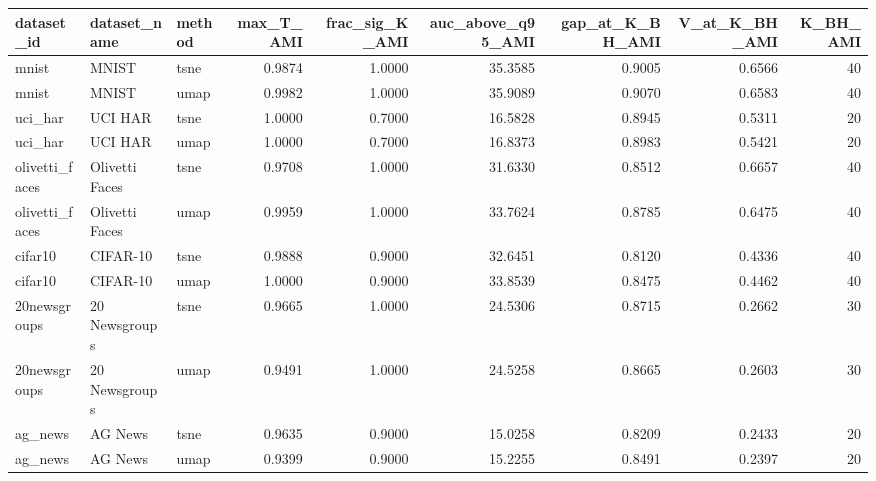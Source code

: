 \begin{tabular}{lllrrrrrr}
\toprule
dataset_id & dataset_name & method & max_T_AMI & frac_sig_K_AMI & auc_above_q95_AMI & gap_at_K_BH_AMI & V_at_K_BH_AMI & K_BH_AMI \\
\midrule
mnist & MNIST & tsne & 0.9874 & 1.0000 & 35.3585 & 0.9005 & 0.6566 & 40 \\
mnist & MNIST & umap & 0.9982 & 1.0000 & 35.9089 & 0.9070 & 0.6583 & 40 \\
uci_har & UCI HAR & tsne & 1.0000 & 0.7000 & 16.5828 & 0.8945 & 0.5311 & 20 \\
uci_har & UCI HAR & umap & 1.0000 & 0.7000 & 16.8373 & 0.8983 & 0.5421 & 20 \\
olivetti_faces & Olivetti Faces & tsne & 0.9708 & 1.0000 & 31.6330 & 0.8512 & 0.6657 & 40 \\
olivetti_faces & Olivetti Faces & umap & 0.9959 & 1.0000 & 33.7624 & 0.8785 & 0.6475 & 40 \\
cifar10 & CIFAR-10 & tsne & 0.9888 & 0.9000 & 32.6451 & 0.8120 & 0.4336 & 40 \\
cifar10 & CIFAR-10 & umap & 1.0000 & 0.9000 & 33.8539 & 0.8475 & 0.4462 & 40 \\
20newsgroups & 20 Newsgroups & tsne & 0.9665 & 1.0000 & 24.5306 & 0.8715 & 0.2662 & 30 \\
20newsgroups & 20 Newsgroups & umap & 0.9491 & 1.0000 & 24.5258 & 0.8665 & 0.2603 & 30 \\
ag_news & AG News & tsne & 0.9635 & 0.9000 & 15.0258 & 0.8209 & 0.2433 & 20 \\
ag_news & AG News & umap & 0.9399 & 0.9000 & 15.2255 & 0.8491 & 0.2397 & 20 \\
\bottomrule
\end{tabular}
